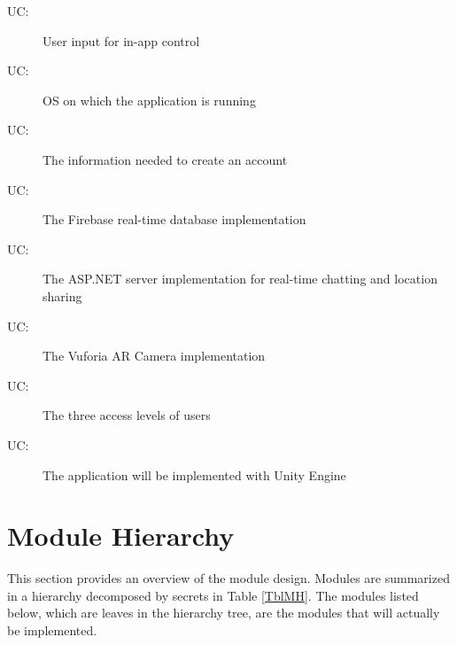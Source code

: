 \documentclass[12pt, titlepage]{article}
\newcounter{ucnum}
\newcommand{\uctheucnum}{UC\theucnum}
\begin{document}
\begin{description}
\item[ \uctheucnum \label{ucInput}:]User input for in-app control
\item[ \uctheucnum \label{ucOS}:]OS on which the application is running
\item[ \uctheucnum \label{ucAccount}:]The information needed to create an account
\item[ \uctheucnum \label{ucDB}:]The Firebase real-time database implementation
\item[ \uctheucnum \label{ucBackend}:]The ASP.NET server implementation for real-time chatting and location sharing
\item[ \uctheucnum \label{ucAR}:]The Vuforia AR Camera implementation
\item[ \uctheucnum \label{ucAccess}:]The three access levels of users
\item[ \uctheucnum \label{ucUnity}:]The application will be implemented with Unity Engine
\end{description}

\section{Module Hierarchy} \label{SecMH}

This section provides an overview of the module design. Modules are summarized
in a hierarchy decomposed by secrets in Table \ref{TblMH}. The modules listed
below, which are leaves in the hierarchy tree, are the modules that will
actually be implemented.
\end{document}

